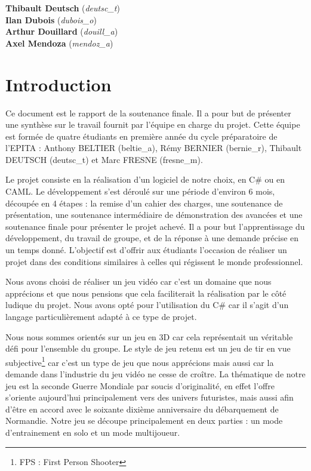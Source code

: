 \documentclass[11pt]{report}
\begin{document}
\begin{titlepage}
\Large
\textbf{Thibault Deutsch} (\emph{deutsc\_t}) \\
\textbf{Ilan Dubois} (\emph{dubois\_o}) \\
\textbf{Arthur Douillard} (\emph{douill\_a}) \\
\textbf{Axel Mendoza} (\emph{mendoz\_a})\\[2cm]

\vfill %

\end{titlepage}

\newpage
{}

\chapter{Introduction}

Ce document est le rapport de la soutenance finale. Il a pour but de présenter une synthèse sur le travail fournit par l'équipe en charge du projet. Cette équipe est formée de quatre étudiants en première année du cycle préparatoire de l'EPITA : Anthony BELTIER (beltie\_a), Rémy BERNIER (bernie\_r), Thibault DEUTSCH (deutsc\_t) et Marc FRESNE (fresne\_m).

Le projet consiste en la réalisation d'un logiciel de notre choix, en C\# ou en CAML. Le développement s'est déroulé sur une période d'environ 6 mois, découpée en 4 étapes : la remise d'un cahier des charges, une soutenance de présentation, une soutenance intermédiaire de démonstration des avancées et une soutenance finale pour présenter le projet achevé. Il a pour but l'apprentissage du développement, du travail de groupe, et de la réponse à une demande précise en un temps donné. L'objectif est d'offrir aux étudiants l'occasion de réaliser un projet dans des conditions similaires à celles qui régissent le monde professionnel.

Nous avons choisi de réaliser un jeu vidéo car c'est un domaine que nous apprécions et que nous pensions que cela faciliterait la réalisation par le côté ludique du projet. Nous avons opté pour l’utilisation du C\# car il s’agit d’un langage particulièrement adapté à ce type de projet. 

Nous nous sommes orientés sur un jeu en 3D car cela représentait un véritable défi pour l'ensemble du groupe. Le style de jeu retenu est un jeu de tir en vue subjective\footnote{FPS : First Person Shooter} car c'est un type de jeu que nous apprécions mais aussi car la demande dans l'industrie du jeu vidéo ne cesse de croître. La thématique de notre jeu est la seconde Guerre Mondiale par soucis d'originalité, en effet l'offre s'oriente aujourd'hui principalement vers des univers futuristes, mais aussi afin d'être en accord avec le soixante dixième anniversaire du débarquement de Normandie. Notre jeu se découpe principalement en deux parties : un mode d'entrainement en solo et un mode multijoueur.
\end{document}
